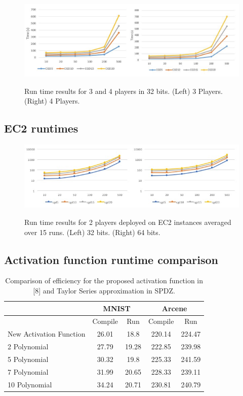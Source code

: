 \documentclass{article}
\begin{document}
\begin{figure}[h]
\centering
  \caption{Run time results for 3 and 4 players in 32 bits. (Left) 3 Players. (Right) 4 Players.}

  \includegraphics[scale=0.6]{multi.jpg}
  \label{fig:result4}
\end{figure}

\subsection{EC2 runtimes}

\begin{figure}[h]
\centering
  \caption{Run time results for 2 players deployed on EC2 instances averaged over 15 runs. (Left) 32 bits. (Right) 64 bits.}
  \includegraphics[scale=0.7]{ec2.jpg}
  \label{fig:result4}
\end{figure}

\subsection{Activation function runtime comparison}

\begin{table}[h]
\centering
\label{my-label}
\caption{Comparison of efficiency for the proposed activation function in [8] and Taylor Series approximation in SPDZ.}
\begin{tabular}{@{}lcccc@{}}
\toprule
                        & \multicolumn{2}{c}{MNIST} & \multicolumn{2}{c}{Arcene} \\ \midrule
                        & Compile      & Run        & Compile      & Run         \\
New Activation Function & 26.01        & 18.8       & 220.14       & 224.47      \\
2 Polynomial            & 27.79        & 19.28      & 222.85       & 239.98      \\
5 Polynomial            & 30.32        & 19.8       & 225.33       & 241.59      \\
7 Polynomial            & 31.99        & 20.65      & 228.33       & 239.11      \\
10 Polynomial           & 34.24        & 20.71      & 230.81       & 240.79      \\ \bottomrule
\end{tabular}
\end{table}
\end{document}
